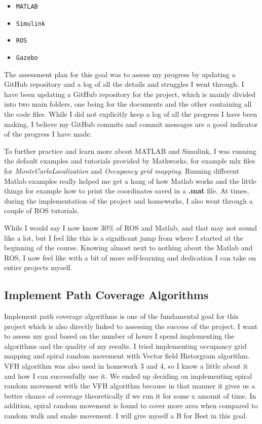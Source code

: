 \documentclass[12pt]{article}
\begin{document}
\begin{itemize}
    \item \texttt{MATLAB}
    \item \texttt{Simulink}
    \item \texttt{ROS}
    \item \texttt{Gazebo}
\end{itemize}

The assessment plan for this goal was to assess my progress by updating a
GitHub repository and a log of all the details and struggles I went through. I
have been updating a GitHub repository for the project, which is mainly divided
into two main folders, one being for the documents and the other containing all
the code files. While I did not explicitly keep a log of all the progress I
have been making, I believe my GitHub commits and commit messages are a good
indicator of the progress I have made.

To further practice and learn more about MATLAB and Simulink, I was running the
default examples and tutorials provided by Mathworks, for example mlx files for
\textit{MonteCarloLocalization} and \textit{Occupancy grid mapping}. Running
different Matlab examples really helped me get a hang of how Matlab works and
the little things for example how to print the coordinates saved in a
\textbf{.mat} file. At times, during the implementation of the project and
homeworks, I also went through a couple of ROS tutorials.

While I would say I now know 30\% of ROS and Matlab, and that may not sound
like a lot, but I feel like this is a significant jump from where I started at
the beginning of the course. Knowing almost next to nothing about the Matlab
and ROS, I now feel like with a bit of more self-learning and dedication I can
take on entire projects myself.

\subsection*{Implement Path Coverage Algorithms}
Implement path coverage algorithms is one of the fundamental goal for this
project which is also directly linked to assessing the success of the project.
I want to assess my goal based on the number of hours I spend implementing the
algorithms and the quality of my results. I tried implementing occupancy grid
mapping and spiral random movement with Vector field Historgram algorithm. VFH
algorithm was also used in homework 3 and 4, so I know a little about it and
how I can successfully use it. We ended up deciding on implementing spiral random movement with the VFH algorithm because in that manner it gives us a better chance of coverage theoretically if we run it for some x amount of time. 
In addition, spiral random movement is found to cover more area when compared to random walk and snake movement. I will give myself a B for Best in this goal. 
\end{document}
